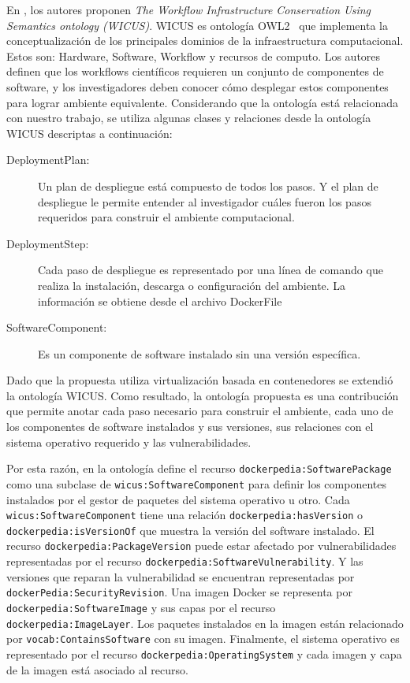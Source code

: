 En \cite{santana2017reproducibility}, los autores proponen \emph{The Workflow Infrastructure Conservation Using Semantics ontology (WICUS)}. WICUS es ontología OWL2~\cite{motik2009owl} que implementa la conceptualización de los principales dominios de la infraestructura computacional. Estos son: Hardware, Software, Workflow y recursos de computo.
Los autores definen que los workflows científicos requieren un conjunto de componentes de software, y los investigadores deben conocer cómo desplegar estos componentes para lograr ambiente equivalente.
Considerando que la ontología está relacionada con nuestro trabajo, se utiliza algunas clases y relaciones desde la ontología WICUS descriptas a continuación:

\begin{description}
	\item [DeploymentPlan:]  Un plan de despliegue está compuesto de todos los pasos. Y el plan de despliegue le permite entender al investigador cuáles fueron los pasos requeridos para construir el ambiente computacional.
	\item [DeploymentStep:] Cada paso de despliegue es representado por una línea de comando que realiza la instalación, descarga o configuración del ambiente. La información se obtiene desde el archivo DockerFile
	\item [SoftwareComponent:] Es un componente de software instalado sin una versión específica. 
\end{description} 

Dado que la propuesta utiliza virtualización basada en contenedores se extendió la ontología WICUS. Como resultado, la ontología propuesta es una contribución que permite anotar cada paso necesario para construir el ambiente, cada uno de los componentes de software instalados y sus versiones, sus relaciones con el sistema operativo requerido y las vulnerabilidades.

Por esta razón, en la ontología define el recurso \texttt{dockerpedia:SoftwarePackage} como una subclase de \texttt{wicus:SoftwareComponent} para definir los componentes instalados por el gestor de paquetes del sistema operativo u otro.
Cada \texttt{wicus:SoftwareComponent} tiene una relación \texttt{dockerpedia:hasVersion} o \texttt{dockerpedia:isVersionOf} que muestra la versión del software instalado.
El recurso \texttt{dockerpedia:PackageVersion} puede estar afectado por vulnerabilidades representadas por el recurso \texttt{dockerpedia:SoftwareVulnerability}. Y las versiones que reparan la vulnerabilidad se encuentran representadas por \texttt{dockerPedia:SecurityRevision}.
Una imagen Docker se representa por \texttt{dockerpedia:SoftwareImage} y sus capas por el recurso \texttt{dockerpedia:ImageLayer}. Los paquetes instalados en la imagen están relacionado por \texttt{vocab:ContainsSoftware} con su imagen.
Finalmente, el sistema operativo es representado por el recurso \texttt{dockerpedia:OperatingSystem} y cada imagen y capa de la imagen está asociado al recurso.

